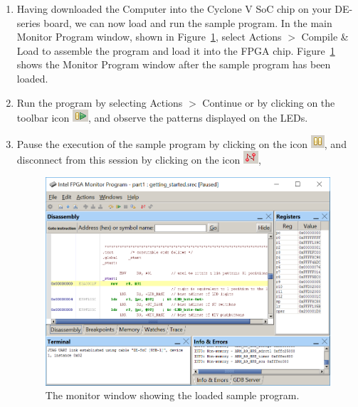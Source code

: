 \documentclass[epsfig,10pt,fullpage]{article}
\begin{document}
\begin{enumerate}
\item Having downloaded the Computer into the Cyclone V SoC chip on your DE-series board, 
we can now load and run the sample program.
In the main Monitor Program window, shown in Figure~\ref{fig:MP9}, 
select {\sf Actions $>$ Compile \& Load} 
to assemble the program and load it into the FPGA chip.
Figure~\ref{fig:MP9} shows the Monitor Program window after the sample program has been loaded. 
\item Run the program by selecting {\sf Actions $>$ Continue} or
by clicking on the toolbar icon \hbox{\includegraphics[scale=0.8]{figures/icon_continue.png}}, 
and observe the patterns displayed on the LEDs. 
\item Pause the execution of the sample program by clicking on the 
icon \hbox{\includegraphics[scale=0.8]{figures/icon_pause.png}}, 
and disconnect from this session
by clicking on the icon \hbox{\includegraphics[scale=0.8]{figures/icon_disconn.png}}, 

\begin{figure}[H]
	\begin{center}
	\includegraphics[scale=0.90]{figures/figureMP9.png}
	\end{center}
	\caption{The monitor window showing the loaded sample program.}
\label{fig:MP9}
\end{figure}

\end{enumerate}
\end{document}
